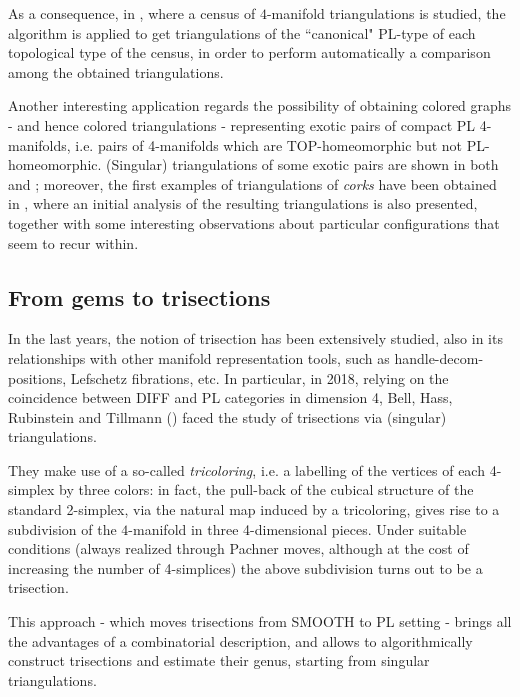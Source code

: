 \documentclass[12pt,a4paper]{article}
\begin{document}
As a consequence, in \cite{Burke-Burton-Spreer}, where a census of $4$-manifold triangulations is studied, the algorithm is applied to get triangulations of the ``canonical" PL-type of each topological type of the census, in order to perform automatically a comparison among the obtained triangulations. 

\smallskip 
Another interesting application regards the possibility of obtaining colored graphs - and hence colored triangulations -  representing exotic pairs of compact PL 4-manifolds, i.e. pairs of 4-manifolds which are TOP-homeomorphic but not PL-homeomorphic. 
(Singular) triangulations of some exotic pairs are shown in both \cite{Casali-Cristofori Kirby-diagrams} and \cite{Burke}; moreover, the first examples of triangulations of {\it corks} have been obtained in \cite{Burke}, where an initial analysis of the resulting triangulations is also presented, together with some interesting observations about particular configurations that seem to recur within.

\bigskip



\subsection{From gems to trisections} \label{ss.from_gems_to_trisections}
\par \noindent



In the last years, the notion of trisection has been extensively studied, also in its relationships with other manifold representation tools, such as handle-decom- positions, Lefschetz ﬁbrations, etc. In particular, in 2018, relying on the coincidence between DIFF and PL categories in dimension 4, Bell, Hass, Rubinstein and Tillmann (\cite{Bell-et-al}) faced the study of trisections via (singular) triangulations.

They make use of a so-called {\it tricoloring}, i.e. a labelling of the vertices of each 4-simplex by three colors: in fact, the pull-back of the cubical structure of the standard 2-simplex, via the natural map induced by a tricoloring, gives rise to a subdivision of the $4$-manifold in three 4-dimensional pieces.  Under suitable conditions (always realized through Pachner moves, although at the cost of increasing the number of 4-simplices) the above subdivision turns out to be a trisection.

This approach - which moves trisections from SMOOTH to PL setting - brings all the advantages of a combinatorial description, and allows to algorithmically construct trisections and estimate their genus, starting from singular triangulations.
\end{document}
